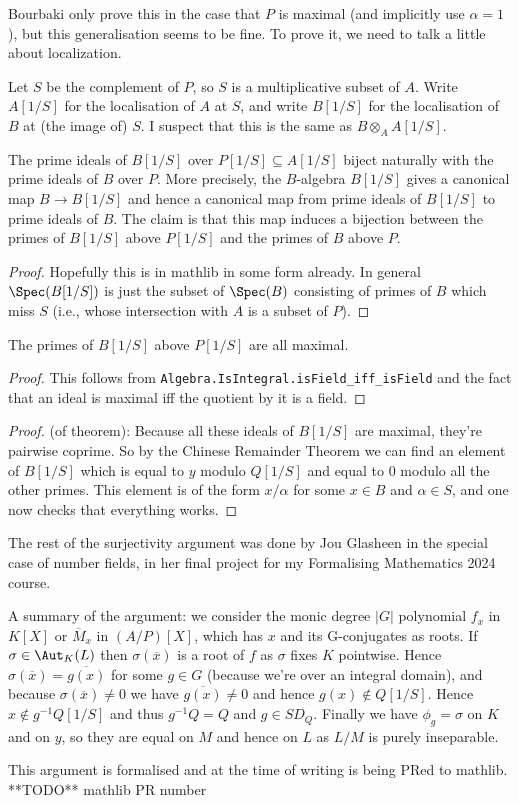 Bourbaki only prove this in the case that $P$ is maximal (and implicitly use $\alpha=1$),
but this generalisation seems to be fine. To prove it, we need to talk a little about localization.

Let $S$ be the complement of $P$, so $S$ is a multiplicative subset of $A$.
Write $A[1/S]$ for the localisation of $A$ at $S$, and write $B[1/S]$
for the localisation of $B$ at (the image of) $S$. I suspect that this is the
same as $B\otimes_AA[1/S]$.

\begin{lemma}
  The prime ideals of $B[1/S]$ over $P[1/S] \subseteq A[1/S]$ biject naturally with
  the prime ideals of $B$ over $P$. More precisely, the $B$-algebra $B[1/S]$
  gives a canonical map $B\to B[1/S]$ and hence a canonical map from prime ideals
  of $B[1/S]$ to prime ideals of $B$. The claim is that this map induces
  a bijection between the primes of $B[1/S]$ above $P[1/S]$ and the primes
  of $B$ above $P$.
\end{lemma}
\begin{proof}
  Hopefully this is in mathlib in some form already. In general $\Spec(B[1/S])$ is just the subset of $\Spec(B)$
  consisting of primes of $B$ which miss $S$ (i.e., whose intersection with $A$ is a subset of $P$).
\end{proof}

\begin{lemma}
  The primes of $B[1/S]$ above $P[1/S]$ are all maximal.
\end{lemma}
\begin{proof}
  This follows from {\tt Algebra.IsIntegral.isField\_iff\_isField} and the fact
  that an ideal is maximal iff the quotient by it is a field.
\end{proof}

\begin{proof}(of theorem):
Because all these ideals of $B[1/S]$ are maximal, they're pairwise coprime.
So by the Chinese Remainder Theorem we can find an element of $B[1/S]$ which
is equal to $y$ modulo $Q[1/S]$ and equal to $0$ modulo all the other primes.
This element is of the form $x/\alpha$ for some $x\in B$ and $\alpha\in S$,
and one now checks that everything works.
\end{proof}

The rest of the surjectivity argument was done
by Jou Glasheen in the special case of number fields, in her
final project for my Formalising Mathematics 2024 course.

A summary of the argument: we consider the monic degree $|G|$ polynomial $f_x$ in $K[X]$ or
$\overline{M}_x$ in $(A/P)[X]$,
which has $x$ and its G-conjugates as roots. If $\sigma\in\Aut_K(L)$ then $\sigma(\overline{x})$
is a root of $f$ as $\sigma$ fixes $K$ pointwise. Hence $\sigma(\overline{x})=\overline{g(x)}$
for some $g\in G$ (because we're over an integral domain), and because $\sigma(\overline{x})\not=0$
we have $\overline{g(x)}\not=0$
and hence $g(x)\notin Q[1/S]$. Hence $x\notin g^{-1} Q[1/S]$ and thus $g^{-1}Q=Q$ and $g\in SD_Q$.
Finally we have $\phi_g=\sigma$ on $K$ and on $y$, so they are equal on $M$ and hence on $L$ as
$L/M$ is purely inseparable.

This argument is formalised and at the time of writing
is being PRed to mathlib.
**TODO** mathlib PR number
